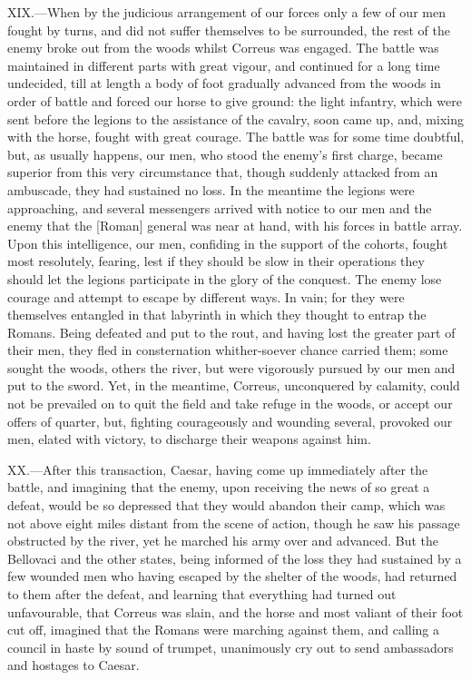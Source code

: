 XIX.—When by the judicious arrangement of our forces only a few of our
men fought by turns, and did not suffer themselves to be surrounded, the
rest of the enemy broke out from the woods whilst Correus was engaged.
The battle was maintained in different parts with great vigour, and
continued for a long time undecided, till at length a body of foot
gradually advanced from the woods in order of battle and forced our
horse to give ground: the light infantry, which were sent before the
legions to the assistance of the cavalry, soon came up, and, mixing with
the horse, fought with great courage. The battle was for some time
doubtful, but, as usually happens, our men, who stood the enemy's first
charge, became superior from this very circumstance that, though
suddenly attacked from an ambuscade, they had sustained no loss. In the
meantime the legions were approaching, and several messengers arrived
with notice to our men and the enemy that the [Roman] general was near
at hand, with his forces in battle array. Upon this intelligence, our
men, confiding in the support of the cohorts, fought most resolutely,
fearing, lest if they should be slow in their operations they should let
the legions participate in the glory of the conquest. The enemy lose
courage and attempt to escape by different ways. In vain; for they were
themselves entangled in that labyrinth in which they thought to entrap
the Romans. Being defeated and put to the rout, and having lost the
greater part of their men, they fled in consternation whither-soever
chance carried them; some sought the woods, others the river, but were
vigorously pursued by our men and put to the sword. Yet, in the
meantime, Correus, unconquered by calamity, could not be prevailed on to
quit the field and take refuge in the woods, or accept our offers of
quarter, but, fighting courageously and wounding several, provoked our
men, elated with victory, to discharge their weapons against him.

XX.—After this transaction, Caesar, having come up immediately after
the battle, and imagining that the enemy, upon receiving the news of so
great a defeat, would be so depressed that they would abandon their
camp, which was not above eight miles distant from the scene of action,
though he saw his passage obstructed by the river, yet he marched his
army over and advanced. But the Bellovaci and the other states, being
informed of the loss they had sustained by a few wounded men who having
escaped by the shelter of the woods, had returned to them after the
defeat, and learning that everything had turned out unfavourable, that
Correus was slain, and the horse and most valiant of their foot cut off,
imagined that the Romans were marching against them, and calling a
council in haste by sound of trumpet, unanimously cry out to send
ambassadors and hostages to Caesar.

